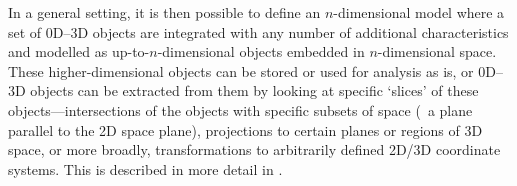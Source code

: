 
In a general setting, it is then possible to define an $n$-dimensional model where a set of 0D--3D objects are integrated with any number of additional characteristics and modelled as up-to-$n$-dimensional objects embedded in $n$-dimensional space.
These higher-dimensional objects can be stored or used for analysis as is, or 0D--3D objects can be extracted from them by looking at specific `slices' of these objects---intersections of the objects with specific subsets of space (\eg\ a plane parallel to the 2D space plane), projections to certain planes or regions of 3D space, or more broadly, transformations to arbitrarily defined 2D/3D coordinate systems.
This is described in more detail in .

